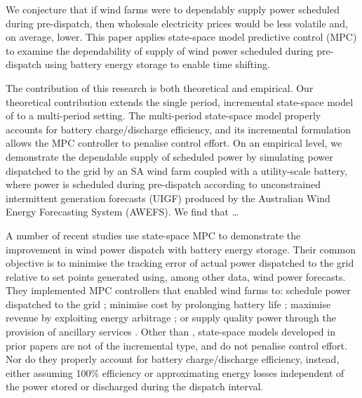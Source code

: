 \documentclass[a4paper, 10pt, twocolumn, preprint, 3p]{elsarticle}
\begin{document}
We conjecture that if wind farms were to dependably supply power scheduled during pre-dispatch, then wholesale electricity prices would be less volatile and, on average, lower.  This paper applies state-space model predictive control (MPC) to examine the dependability of supply of wind power scheduled during pre-dispatch using battery energy storage to enable time shifting.

The contribution of this research is both theoretical and empirical.  Our theoretical contribution extends the single period, incremental state-space model of \cite{TREB16} to a multi-period setting.  The multi-period state-space model properly accounts for battery charge/discharge efficiency, and its incremental formulation allows the MPC controller to penalise control effort.  On an empirical level, we demonstrate the dependable supply of scheduled power by simulating power dispatched to the grid by an SA wind farm coupled with a utility-scale battery, where power is scheduled during pre-dispatch according to unconstrained intermittent generation forecasts (UIGF) produced by the Australian Wind Energy Forecasting System (AWEFS).  We find that \ldots

A number of recent studies use state-space MPC to demonstrate the improvement in wind power dispatch with battery energy storage.  Their common objective is to minimise the tracking error of actual power dispatched to the grid relative to set points generated using, among other data, wind power forecasts.  They implemented MPC controllers that enabled wind farms to: schedule power dispatched to the grid \cite{HALBB14,TBBH10}; minimise cost by prolonging battery life \cite{KS10,YCTL12}; maximise revenue by exploiting energy arbitrage \cite{KKSA13}; or supply quality power through the provision of ancillary services \cite{YCTL14}.  Other than \cite{TREB16}, state-space models developed in prior papers are not of the incremental type, and do not penalise control effort.  Nor do they properly account for battery charge/discharge efficiency, instead, either assuming 100\% efficiency or approximating energy losses independent of the power stored or discharged during the dispatch interval.

\end{document}
